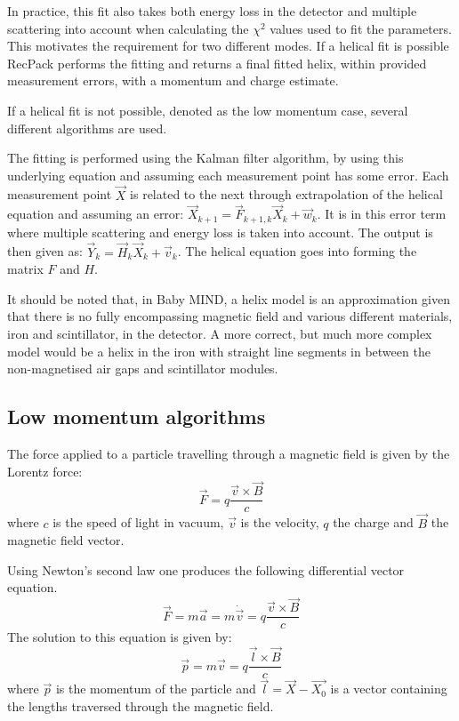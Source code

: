 In practice, this fit also takes both energy loss in the detector and multiple scattering into account when calculating the $\chi^2$ values used to fit the parameters. This motivates the requirement for two different modes. If a helical fit is possible RecPack performs the fitting and returns a final fitted helix, within provided measurement errors, with a momentum and charge estimate.

If a helical fit is not possible, denoted as the low momentum case, several different algorithms are used.

The fitting is performed using the Kalman filter algorithm, by using this underlying equation and assuming each measurement point has some error. Each measurement point $\vec{X}$ is related to the next through extrapolation of the helical equation and assuming an error: $\vec{X}_{k+1} = \vec{F}_{k+1,k}\vec{X}_k + \vec{w}_k$. It is in this error term where multiple scattering and energy loss is taken into account. The output is then given as: $\vec{Y}_{k} = \vec{H}_{k}\vec{X}_k + \vec{v}_k$. The helical equation goes into forming the matrix $F$ and $H$.

It should be noted that, in Baby MIND, a helix model is an approximation given that there is no fully encompassing magnetic field and various different materials, iron and scintillator, in the detector. A more correct, but much more complex model would be a helix in the iron with straight line segments in between the non-magnetised air gaps and scintillator modules.

\subsection{Low momentum algorithms}
The force applied to a particle travelling through a magnetic field is given by the Lorentz force:
\begin{equation}
\vec{F}=q\frac{\vec{v}\times\vec{B}}{c}
\end{equation}
where $c$ is the speed of light in vacuum, $\vec{v}$ is the velocity, $q$ the charge and $\vec{B}$ the magnetic field vector.

Using Newton's second law one produces the following differential vector equation.
\begin{equation}
\vec{F}=m\vec{a}=m\dot{\vec{v}}=q\frac{\vec{v}\times\vec{B}}{c}
\end{equation}
The solution to this equation is given by:
\begin{equation}
\vec{p}=m\vec{v}=q\frac{\vec{l}\times\vec{B}}{c}
\end{equation} 
where $\vec{p}$ is the momentum of the particle and $\vec{l}=\vec{X}-\vec{X_0}$ is a vector containing the lengths traversed through the magnetic field.

